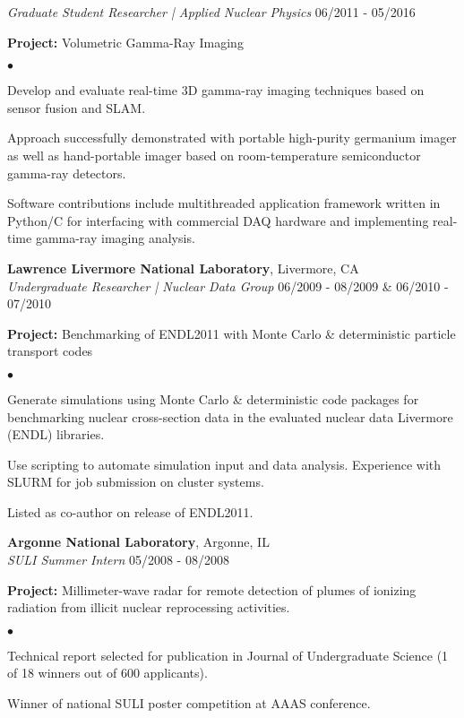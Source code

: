 \documentclass[margin,line]{res}
\newenvironment{list1}{
  \begin{list}{\ding{113}}{%
      \setlength{\itemsep}{0in}
      \setlength{\parsep}{0in} \setlength{\parskip}{0in}
      \setlength{\topsep}{0in} \setlength{\partopsep}{0in} 
      \setlength{\leftmargin}{0.17in}}}{\end{list}}
\newenvironment{list2}{
  \begin{list}{$\bullet$}{%
      \setlength{\itemsep}{0in}
      \setlength{\parsep}{0in} \setlength{\parskip}{0in}
      \setlength{\topsep}{0in} \setlength{\partopsep}{0in} 
      \setlength{\leftmargin}{0.2in}}}{\end{list}}
\begin{document}
\begin{resume}
{\em Graduate Student Researcher | Applied Nuclear Physics} \hfill 06/2011 - 05/2016

\begin{list1}
  \item[] {\bf \small Project:} Volumetric Gamma-Ray Imaging
  \begin{list2}
    \item Develop and evaluate real-time 3D gamma-ray imaging techniques based
          on sensor fusion and SLAM.
    \item Approach successfully demonstrated with portable high-purity 
          germanium imager as well as hand-portable imager based on 
          room-temperature semiconductor gamma-ray detectors.
    \item Software contributions include multithreaded application framework
          written in Python/C for interfacing with commercial DAQ hardware and
          implementing real-time gamma-ray imaging analysis.
  \end{list2}
\end{list1}

{\bf Lawrence Livermore National Laboratory}, Livermore, CA \\ 
{\em Undergraduate Researcher | Nuclear Data Group} \hfill 06/2009 - 08/2009 \& 06/2010 - 07/2010

\begin{list1}
  \item[] {\bf \small Project:} Benchmarking of ENDL2011 with Monte Carlo \& 
                                deterministic particle transport codes
  \begin{list2}
    \item Generate simulations using Monte Carlo \& deterministic code packages
          for benchmarking nuclear cross-section data in the evaluated nuclear
          data Livermore (ENDL) libraries.
    \item Use scripting to automate simulation input and data analysis.
          Experience with SLURM for job submission on cluster systems.
    \item Listed as co-author on release of ENDL2011.
  \end{list2}
\end{list1}

{\bf Argonne National Laboratory}, Argonne, IL \\ 
{\em SULI Summer Intern} \hfill 05/2008 - 08/2008

\begin{list1}
  \item[] {\bf \small Project:} Millimeter-wave radar for remote detection of
                                plumes of ionizing radiation from illicit
                                nuclear reprocessing activities.
  \begin{list2}
    \item Technical report selected for publication in Journal of Undergraduate
            Science (1 of 18 winners out of 600 applicants).
    \item Winner of national SULI poster competition at AAAS conference.
  \end{list2}
\end{list1}


\end{resume}
\end{document}
